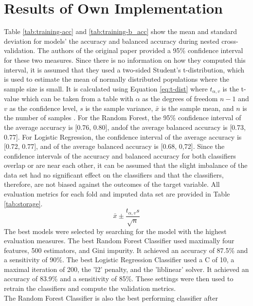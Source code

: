 \section{Results of Own Implementation}
Table \ref{tab:training-acc} and \ref{tab:training-b_acc} show the mean and 
standard deviation for models' the accuracy and balanced accuracy during 
nested cross-validation. The authors of the original paper provided a 95\% 
confidence interval for these two measures. Since there is no information on 
how they computed this interval, it is assumed that they used a two-sided 
Student's t-distribution, which is used to estimate the mean of normally 
distributed populations where the sample size is small. It is calculated using 
Equation \ref{eq:t-dist} where 
$t_{\alpha, v}$ is the t-value which can be taken from a table with $\alpha$ 
as the degrees of freedom $n-1$ and $v$ as the confidence level, $s$ is the 
sample variance, $\bar{x}$ is the sample mean, and $n$ is the number of samples 
\cite{RN197}.
For the Random Forest, the 95\% confidence interval of the average accuracy is 
[0.76, 0.80], andof the average balanced accuracy is [0.73, 0.77]. 
For Logistic Regression, the confidence interval of the average accuracy is 
[0.72, 0.77], and of the average balanced accuracy is [0.68, 0,72]. Since the 
confidence intervals of the accuracy and balanced accuracy for both classifiers 
overlap or are near each other, it can be assumed that the slight imbalance of 
the data set had no significant effect on the classifiers and that the 
classifiers, therefore, are not biased against the outcomes of the target 
variable. All evaluation metrics for each fold and imputed data set are 
provided in Table \ref{tab:storage}.
\begin{equation}
 \bar{x} \pm \frac{t_{\alpha, v}s}{\sqrt{n}}
 \label{eq:t-dist}
\end{equation}
The best models were selected by searching for the model with the highest 
evaluation measures. The best Random Forest Classifier used 
maximally 
four features, 500 estimators, and Gini impurity. It achieved an accuracy of 
87.5\% and a 
sensitivity of 90\%. The best Logistic Regression Classifier used a C of 10, a 
maximal iteration of 200, the 'l2' penalty, and the 'liblinear' solver. It 
achieved an accuracy 
of 83.9\% and a sensitivity of 85\%. These settings were then used to retrain 
the classifiers and compute the validation metrics.
\\
The Random Forest Classifier is also the best performing classifier after 
